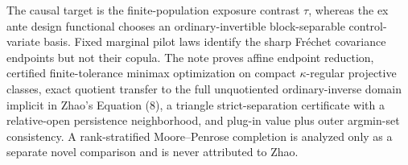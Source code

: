 The causal target is the finite-population exposure contrast \(\tau\), whereas the ex ante design functional chooses an ordinary-invertible block-separable control-variate basis.  Fixed marginal pilot laws identify the sharp Fr\'echet covariance endpoints but not their copula.  The note proves affine endpoint reduction, certified finite-tolerance minimax optimization on compact \(\kappa\)-regular projective classes, exact quotient transfer to the full unquotiented ordinary-inverse domain implicit in Zhao's Equation (8), a triangle strict-separation certificate with a relative-open persistence neighborhood, and plug-in value plus outer argmin-set consistency.  A rank-stratified Moore--Penrose completion is analyzed only as a separate novel comparison and is never attributed to Zhao.